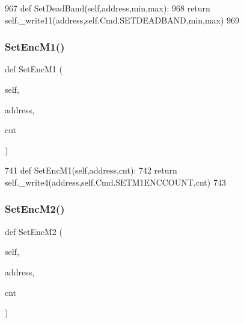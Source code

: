 \begin{DoxyCode}
967     \textcolor{keyword}{def }SetDeadBand(self,address,min,max):
968         \textcolor{keywordflow}{return} self.\_write11(address,self.Cmd.SETDEADBAND,min,max)
969 
\end{DoxyCode}
\mbox{\label{classtoxic__hardware_1_1roboclaw__3_1_1Roboclaw_a534607e041ee0ebe7cc66261071b537d}} 
\subsubsection{\texorpdfstring{Set\+Enc\+M1()}{SetEncM1()}}
{\footnotesize\ttfamily def Set\+Enc\+M1 (\begin{DoxyParamCaption}\item[{}]{self,  }\item[{}]{address,  }\item[{}]{cnt }\end{DoxyParamCaption})}


\begin{DoxyCode}
741     \textcolor{keyword}{def }SetEncM1(self,address,cnt):
742         \textcolor{keywordflow}{return} self.\_write4(address,self.Cmd.SETM1ENCCOUNT,cnt)
743 
\end{DoxyCode}
\mbox{\label{classtoxic__hardware_1_1roboclaw__3_1_1Roboclaw_a8b54c048cc6b6aa19d4123f3d78dfb54}} 
\subsubsection{\texorpdfstring{Set\+Enc\+M2()}{SetEncM2()}}
{\footnotesize\ttfamily def Set\+Enc\+M2 (\begin{DoxyParamCaption}\item[{}]{self,  }\item[{}]{address,  }\item[{}]{cnt }\end{DoxyParamCaption})}


